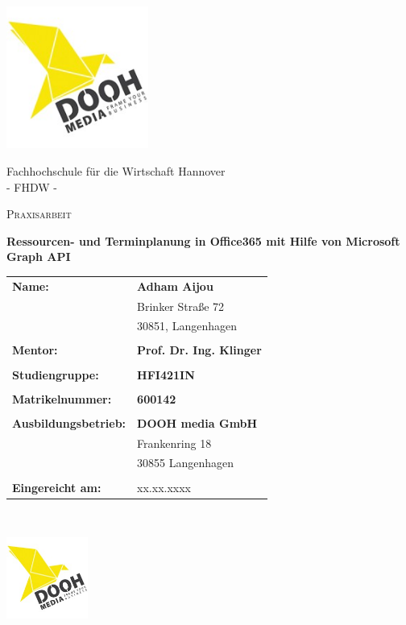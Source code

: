 



\begin{titlepage}
    \centering
    \includegraphics[width=0.35\textwidth]{Bilder/doohMedia}\par\vspace{1cm}
    Fachhochschule für die Wirtschaft Hannover \\
    - FHDW -\\
    {\scshape\Large Praxisarbeit \par}
    \vspace{1cm}
    {\huge\bfseries Ressourcen- und Terminplanung in Office365 mit Hilfe von Microsoft Graph API \par}
    \vspace{1cm}
    \normalsize{
        \begin{tabular}{l l}
            \textbf{Name:} & \textbf{Adham Aijou} \\
            &	Brinker Straße 72 \\
            &	30851, Langenhagen \\
            \\

            \textbf{Mentor:} & \textbf{Prof. Dr.  Ing. Klinger}\\
            \\
            \textbf{Studiengruppe:} & \textbf{HFI421IN}\\
            \\
            \textbf{Matrikelnummer:}  & \textbf{600142} \\
            \\
            \textbf{Ausbildungsbetrieb:}  & \textbf{DOOH media GmbH}\\
            & Frankenring 18\\
            & 30855 Langenhagen    \\
            \\
            \textbf{Eingereicht am:} & xx.xx.xxxx
        \end{tabular}\\
    }
    \vfill
    \flushright \includegraphics[width=0.2\textwidth]{Bilder/doohMedia}\par\vspace{1cm}

\end{titlepage}

